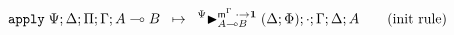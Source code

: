 
\[
   \mathtt{apply} \; \Psi; \Delta; \Pi; \Gamma; A \multimap B \;\; \mapsto \;\; {}^{\Psi}{\blacktriangleright}_{A \multimap B}^{\mathsf{m}^\Gamma \; \cdot \rightarrow
   \mathbf{1}} \; (\Delta; \Phi); \cdot; \Gamma; \Delta; A \tag{init
                                                            rule}
\]

